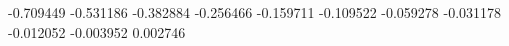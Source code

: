 -0.709449
-0.531186
-0.382884
-0.256466
-0.159711
-0.109522
-0.059278
-0.031178
-0.012052
-0.003952
0.002746
